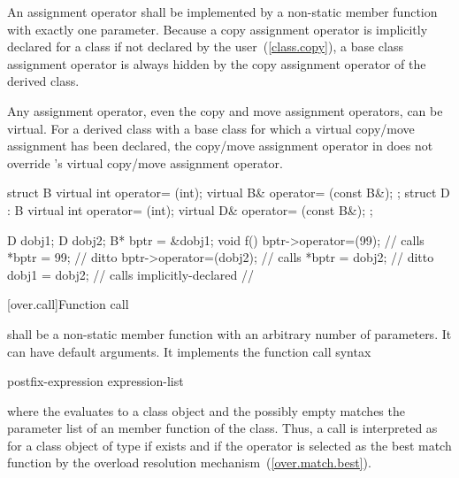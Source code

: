 \pnum
An assignment operator shall be implemented by a
non-static member function with
exactly one parameter.
Because a copy assignment operator
is implicitly declared for a class if not declared by the user~(\ref{class.copy}),
a base class assignment operator is always hidden by the copy assignment
operator of the derived class.

\pnum
Any assignment operator, even the copy and move assignment operators, can be virtual.
\enternote
For a derived class
with a base class
for which a virtual copy/move assignment has been declared,
the copy/move assignment operator in
does not override
's
virtual copy/move assignment operator.
\enterexample

\begin{codeblock}
struct B {
  virtual int operator= (int);
  virtual B& operator= (const B&);
};
struct D : B {
  virtual int operator= (int);
  virtual D& operator= (const B&);
};

D dobj1;
D dobj2;
B* bptr = &dobj1;
void f() {
  bptr->operator=(99);          // calls 
  *bptr = 99;                   // ditto
  bptr->operator=(dobj2);       // calls 
  *bptr = dobj2;                // ditto
  dobj1 = dobj2;                // calls implicitly-declared
                                // 
}
\end{codeblock}
\exitexample
\exitnote

[over.call]{Function call}%
%

\pnum
{}
shall be a non-static member function with an arbitrary number of
parameters.
It can have default arguments.
It implements the function call syntax

\begin{ncsimplebnf}
postfix-expression \terminal{(} expression-list\opt \terminal{)}
\end{ncsimplebnf}

where the
evaluates to a class object and the possibly empty
matches the parameter list of an
member function of the class.
Thus, a call
is interpreted as
for a class object
of type
if
exists and if the operator is selected as the best match function by
the overload resolution mechanism~(\ref{over.match.best}).

